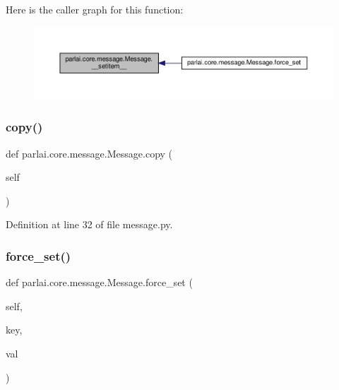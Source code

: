 Here is the caller graph for this function\+:
\nopagebreak
\begin{figure}[H]
\begin{center}
\leavevmode
\includegraphics[width=350pt]{classparlai_1_1core_1_1message_1_1Message_a2fd83603b06a7da7ab7fc99649d855f6_icgraph}
\end{center}
\end{figure}
\mbox{\label{classparlai_1_1core_1_1message_1_1Message_a374ac4a5d73e853960cc0f964b73a7fd}} 
\subsubsection{\texorpdfstring{copy()}{copy()}}
{\footnotesize\ttfamily def parlai.\+core.\+message.\+Message.\+copy (\begin{DoxyParamCaption}\item[{}]{self }\end{DoxyParamCaption})}



Definition at line 32 of file message.\+py.

\mbox{\label{classparlai_1_1core_1_1message_1_1Message_acbafaa2540a6b2ca6513fe9db49a9291}} 
\subsubsection{\texorpdfstring{force\+\_\+set()}{force\_set()}}
{\footnotesize\ttfamily def parlai.\+core.\+message.\+Message.\+force\+\_\+set (\begin{DoxyParamCaption}\item[{}]{self,  }\item[{}]{key,  }\item[{}]{val }\end{DoxyParamCaption})}



